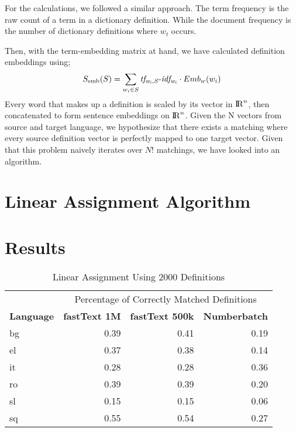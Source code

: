 For the \tfidf{} calculations, we followed a similar approach.
The term frequency is the raw count of a term in a dictionary definition.
While the document frequency is the number of dictionary definitions where $w_t$ occurs.

Then, with the term-embedding matrix at hand, we have calculated definition embeddings using;
\begin{equation}
    S_{\text{emb}}(S) = \sum_{w_{i} \in S} {\operatorname{\mathit{tf_{w_{i},S}-idf_{w_i}}}} \cdot Emb_{w}(w_{i})
\end{equation}
Every word that makes up a definition is scaled by its vector in ${\rm I\!R}^n$, then concatenated to form sentence embeddings on ${\rm I\!R}^n$.
Given the N vectors from source and target language, we hypothesize that there exists a matching where every source definition vector is perfectly mapped to one target vector.
Given that this problem naively iterates over $N!$ matchings, we have looked into an algorithm.

%
\section{Linear Assignment Algorithm}%
\label{sec:linear_assignment_algorithm}



\section{Results}%
\label{sec:results}

\begin{table}[htbp]
    \centering
    \begin{tabular}{lrrr}
        \toprule
& \multicolumn{3}{c}{Percentage of Correctly Matched Definitions} \\
\cmidrule(lr){2-4}
        \textbf{Language} & \textbf{fastText 1M} & \textbf{fastText 500k} & \textbf{Numberbatch} \\
        \midrule
        bg & 0.39 & 0.41 & 0.19 \\
        el & 0.37 & 0.38 & 0.14 \\
        it & 0.28 & 0.28 & 0.36 \\
        ro & 0.39 & 0.39 & 0.20 \\
        sl & 0.15 & 0.15 & 0.06 \\
        sq & 0.55 & 0.54 & 0.27 \\
        \bottomrule
    \end{tabular}
    \caption{Linear Assignment Using 2000 Definitions}%
    \label{tab:lapjv_2000}
\end{table}

